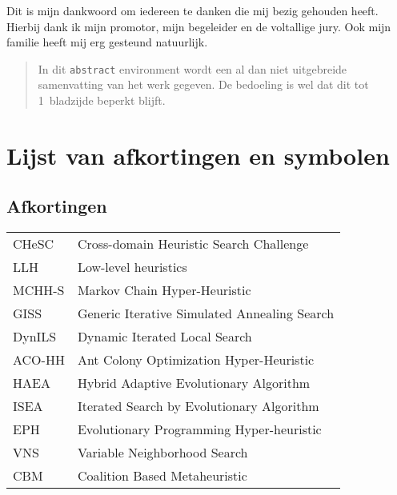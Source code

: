 \documentclass[master=elt,masteroption=ge]{kulemt}
\begin{document}
\begin{preface}
  Dit is mijn dankwoord om iedereen te danken die mij bezig gehouden heeft.
  Hierbij dank ik mijn promotor, mijn begeleider en de voltallige jury.
  Ook mijn familie heeft mij erg gesteund natuurlijk.
\end{preface}

\tableofcontents*

\begin{abstract}
  In dit \texttt{abstract} environment wordt een al dan niet uitgebreide
  samenvatting van het werk gegeven. De bedoeling is wel dat dit tot
  1~bladzijde beperkt blijft.

  \lipsum[1]
\end{abstract}

\listoffiguresandtables
\chapter{Lijst van afkortingen en symbolen}
\section*{Afkortingen}
\begin{flushleft}
  \renewcommand{\arraystretch}{1.1}
  \begin{tabularx}{\textwidth}{@{}p{22mm}X@{}}%
    CHeSC	& Cross-domain Heuristic Search Challenge \\
    LLH		&Low-level heuristics \\
    MCHH-S	&Markov Chain Hyper-Heuristic\\
    GISS	&Generic Iterative Simulated Annealing Search\\
    DynILS	&Dynamic Iterated Local Search\\
    ACO-HH	&Ant Colony Optimization Hyper-Heuristic\\
    HAEA	&Hybrid Adaptive Evolutionary Algorithm\\
    ISEA	&Iterated Search by Evolutionary Algorithm\\
    EPH		&Evolutionary Programming Hyper-heuristic\\
    VNS		&Variable Neighborhood Search\\
    CBM		&Coalition Based Metaheuristic
  \end{tabularx}
\end{flushleft}
\end{document}

